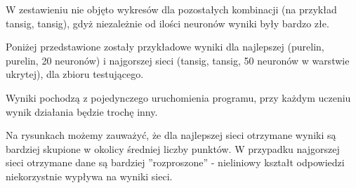 \documentclass[12pt]{article}
\begin{document}
W zestawieniu nie objęto wykresów dla pozostałych kombinacji (na przykład tansig, tansig),  gdyż niezależnie od ilości neuronów wyniki były bardzo złe.

\vspace{0.5cm}

Poniżej przedstawione zostały przykładowe wyniki dla najlepszej (purelin, purelin, 20 neuronów) i najgorszej sieci (tansig, tansig, 50 neuronów w warstwie ukrytej), dla zbioru testującego.

Wyniki pochodzą z pojedynczego uruchomienia programu, przy każdym uczeniu wynik działania będzie trochę inny. 

Na rysunkach możemy zauważyć, że dla najlepszej sieci otrzymane wyniki są bardziej skupione w okolicy średniej liczby punktów. W przypadku najgorszej sieci otrzymane dane są bardziej ''rozproszone'' -  nieliniowy kształt odpowiedzi niekorzystnie wypływa na wyniki sieci.
\end{document}
